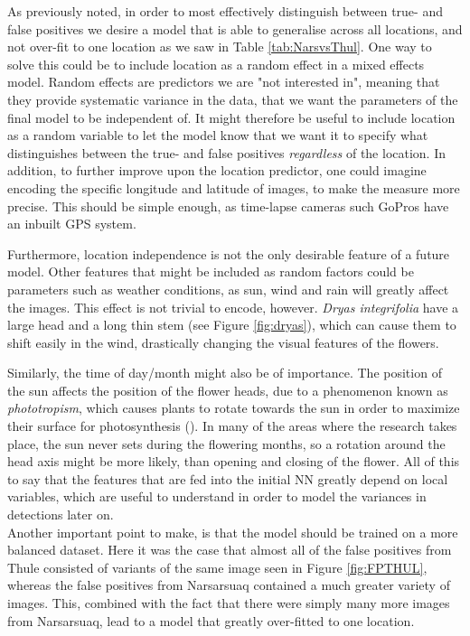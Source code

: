 \documentclass[12pt]{article}
\begin{document}
As previously noted, in order to most effectively distinguish between true- and false positives we desire a model that is able to generalise across all locations, and not over-fit to one location as we saw in Table \ref{tab:NarsvsThul}. One way to solve this could be to include location as a random effect in a mixed effects model. Random effects are predictors we are "not interested in", meaning that they provide systematic variance in the data, that we want the parameters of the final model to be independent of. It might therefore be useful to include location as a random variable to let the model know that we want it to specify what distinguishes between the true- and false positives \textit{regardless} of the location.  
In addition, to further improve upon the location predictor, one could imagine encoding the specific longitude and latitude of images, to make the measure more precise. This should be simple enough, as time-lapse cameras such GoPros have an inbuilt GPS system.

Furthermore, location independence is not the only desirable feature of a future model. Other features that might be included as random factors could be parameters such as weather conditions, as sun, wind and rain will greatly affect the images. This effect is not trivial to encode, however. \textit{Dryas integrifolia} have a large head and a long thin stem (see Figure \ref{fig:dryas}), which can cause them to shift easily in the wind, drastically changing the visual features of the flowers. 

Similarly, the time of day/month might also be of importance. The position of the sun affects the position of the flower heads, due to a phenomenon known as \textit{phototropism}, which causes plants to rotate towards the sun in order to maximize their surface for photosynthesis (\cite{editorsPhototropism2017}). In many of the areas where the research takes place, the sun never sets during the flowering months, so a rotation around the head axis might be more likely, than opening and closing of the flower. All of this to say that the features that are fed into the initial NN greatly depend on local variables, which are useful to understand in order to model the variances in detections later on.\\

Another important point to make, is that the model should be trained on a more balanced dataset. Here it was the case that almost all of the false positives from Thule consisted of variants of the same image seen in Figure \ref{fig:FPTHUL}, whereas the false positives from Narsarsuaq contained a much greater variety of images. This, combined with the fact that there were simply many more images from Narsarsuaq, lead to a model that greatly over-fitted to one location.\\
\end{document}
